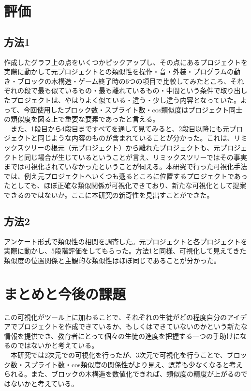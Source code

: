 \documentclass[twocolumn,9pt,a4paper]{jsarticle}
\begin{document}
\section{評価}
\subsection{方法1}
作成したグラフ上の点をいくつかピックアップし、その点にあるプロジェクトを実際に動かして元プロジェクトとの類似性を操作・音・外装・プログラムの動き・ブロックの木構造・ゲーム終了時の6つの項目で比較してみたところ、それぞれの段で最も似ているもの・最も離れているもの・中間という条件で取り出したプロジェクトは、やはりよく似ている・違う・少し違う内容となっていた。よって、今回使用したブロック数・スプライト数・cos類似度はプロジェクト同士の類似度を図る上で重要な要素であったと言える。
\\
　また、1段目から4段目まですべてを通して見てみると、2段目以降にも元プロジェクトと同じような内容のものが含まれていることが分かった。これは、リミックスツリーの根元（元プロジェクト）から離れたプロジェクトも、元プロジェクトと同じ場合が生じているということが言え、リミックスツリーではその事実までは可視化されていなかったということが伺える。本研究で行った可視化手法では、例え元プロジェクトへいくつも遡るところに位置するプロジェクトであったとしても、ほぼ正確な類似関係が可視化できており、新たな可視化として提案できるのではないか。ここに本研究の新奇性を見出すことができた。

\subsection{方法2}
アンケート形式で類似性の相関を調査した。元プロジェクトと各プロジェクトを実際に動かし、5段階評価をしてもらった。方法1と同様、可視化して見えてきた類似度の位置関係と主観的な類似性はほぼ同じであることが分かった。

\section{まとめと今後の課題}
この可視化がツール上に加わることで、それぞれの生徒がどの程度自分のアイデアでプロジェクトを作成できているか、もしくはできていないのかという新たな情報を提供でき、教育者にとって個々の生徒の進度を把握する一つの手助けになるのではないかと考えている。
\\
　本研究では2次元での可視化を行ったが、3次元で可視化を行うことで、ブロック数・スプライト数・cos類似度の関係性がより見え、誤差も少なくなると考えられる。また、ブロックの木構造を数値化できれば、類似度の精度が上がるのではないかと考えている。
\end{document}
